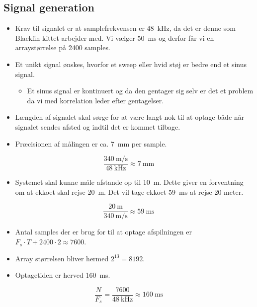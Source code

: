 \documentclass[danish]{article}
\begin{document}
\subsection{Signal generation}
\begin{itemize}
	\item Krav til signalet er at samplefrekvensen er \SI{48}{\kilo\hertz}, da det er denne som Blackfin kittet arbejder med. Vi vælger \SI{50}{\milli\second} og derfor får vi en arraystørrelse på 2400 samples.
	\item Et unikt signal ønskes, hvorfor et sweep eller hvid støj er bedre end et sinus signal. 
	\begin{itemize}
		\item Et sinus signal er kontinuert og da den gentager sig selv er det et problem da vi med korrelation leder efter gentagelser.
	\end{itemize} 
	\item Længden af signalet skal sørge for at være langt nok til at optage både når signalet sendes afsted og indtil det er kommet tilbage. 
	\item Præcisionen af målingen er ca. \SI{7}{\milli\meter} per sample.
\end{itemize} 
\begin{equation}
 \frac{\SI{340}{\meter\per\second}}{\SI{48}{\kilo\hertz}} \approx \SI{7}{\milli\meter}
\end{equation}
\begin{itemize}
	\item Systemet skal kunne måle afstande op til \SI{10}{\meter}. Dette giver en forventning om at ekkoet skal rejse \SI{20}{\meter}. Det vil tage ekkoet \SI{59}{\milli\second} at rejse 20 meter.
\end{itemize}
\begin{equation}
\frac{\SI{20}{\meter}}{\SI{340}{\meter\per\second}} \approx \SI{59}{\milli\second}
\end{equation}
\begin{itemize}
	\item Antal samples der er brug for til at optage afspilningen er $F_s \cdot T + 2400 \cdot 2 \approx 7600$.
	\item Array størrelsen bliver hermed $2^{13} = 8192$.
	\item Optagetiden er herved \SI{160}{\milli\second}.
\end{itemize}
\begin{equation}
\frac{N}{F_s} = \frac{7600}{\SI{48}{\kilo\hertz}} \approx \SI{160}{\milli\second}
\end{equation}
\end{document}
